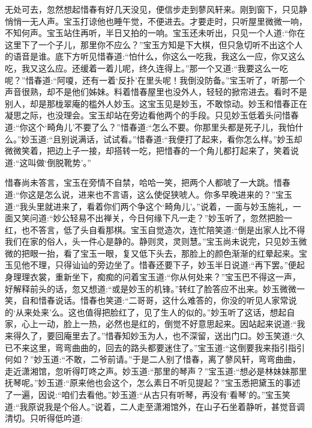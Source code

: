 \begin{parag}
    无处可去，忽然想起惜春有好几天没见，便信步走到蓼风轩来。刚到窗下，只见静悄悄一无人声。宝玉打谅他也睡午觉，不便进去。才要走时，只听屋里微微一响，不知何声。宝玉站住再听，半日又拍的一响。宝玉还未听出，只见一个人道:“你在这里下了一个子儿，那里你不应么？”宝玉方知是下大棋，但只急切听不出这个人的语音是谁。底下方听见惜春道:“怕什么，你这么一吃我，我这么一应，你又这么吃，我又这么应。还缓着一着儿呢，终久连得上。”那一个又道:“我要这么一吃呢？”惜春道:“阿嗄，还有一着‘反扑’在里头呢！我倒没防备。”宝玉听了，听那一个声音很熟，却不是他们姊妹。料着惜春屋里也没外人，轻轻的掀帘进去。看时不是别人，却是那栊翠庵的槛外人妙玉。这宝玉见是妙玉，不敢惊动。妙玉和惜春正在凝思之际，也没理会。宝玉却站在旁边看他两个的手段。只见妙玉低着头问惜春道:“你这个‘畸角儿’不要了么？”惜春道:“怎么不要。你那里头都是死子儿，我怕什么。”妙玉道:“且别说满话，试试看。”惜春道:“我便打了起来，看你怎么样。”妙玉却微微笑着，把边上子一接，却搭转一吃，把惜春的一个角儿都打起来了，笑着说道:“这叫做‘倒脱靴势’。”
\end{parag}


\begin{parag}
    惜春尚未答言，宝玉在旁情不自禁，哈哈一笑，把两个人都唬了一大跳。惜春道:“你这是怎么说，进来也不言语，这么使促狭唬人。你多早晚进来的？”宝玉道:“我头里就进来了，看着你们两个争这个‘畸角儿’。”说着，一面与妙玉施礼，一面又笑问道:“妙公轻易不出禅关，今日何缘下凡一走？”妙玉听了，忽然把脸一红，也不答言，低了头自看那棋。宝玉自觉造次，连忙陪笑道:“倒是出家人比不得我们在家的俗人，头一件心是静的。静则灵，灵则慧。”宝玉尚未说完，只见妙玉微微的把眼一抬，看了宝玉一眼，复又低下头去，那脸上的颜色渐渐的红晕起来。宝玉见他不理，只得讪讪的旁边坐了。惜春还要下子，妙玉半日说道:“再下罢。”便起身理理衣裳，重新坐下，痴痴的问着宝玉道:“你从何处来？”宝玉巴不得这一声，好解释前头的话，忽又想道:“或是妙玉的机锋。”转红了脸答应不出来。妙玉微微一笑，自和惜春说话。惜春也笑道:“二哥哥，这什么难答的，你没的听见人家常说的‘从来处来’么。这也值得把脸红了，见了生人的似的。”妙玉听了这话，想起自家，心上一动，脸上一热，必然也是红的，倒觉不好意思起来。因站起来说道:“我来得久了，要回庵里去了。”惜春知妙玉为人，也不深留，送出门口。妙玉笑道:“久已不来这里，弯弯曲曲的，回去的路头都要迷住了。”宝玉道:“这倒要我来指引指引何如？”妙玉道:“不敢，二爷前请。”于是二人别了惜春，离了蓼风轩，弯弯曲曲，走近潇湘馆，忽听得叮咚之声。妙玉道:“那里的琴声？”宝玉道:“想必是林妹妹那里抚琴呢。”妙玉道:“原来他也会这个，怎么素日不听见提起？”宝玉悉把黛玉的事述了一遍，因说:“咱们去看他。”妙玉道:“从古只有听琴，再没有‘看琴’的。”宝玉笑道:“我原说我是个俗人。”说着，二人走至潇湘馆外，在山子石坐着静听，甚觉音调清切。只听得低吟道:
\end{parag}


